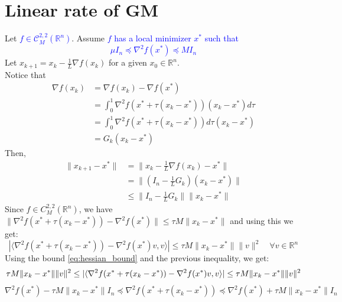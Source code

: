 \documentclass[12pt, openany]{report}
\newcommand{\R}{\mathbb{R}}
\newcommand{\C}{\mathcal{C}}
\theoremstyle{definition}
\begin{document}
\section{Linear rate of GM}
Let \textcolor{blue}{$f \in \C_M^{2,2}(\R^n)$}. Assume \textcolor{blue}{$f$ has a local minimizer $x^*$ such that 
\begin{equation}\label{eq:hessian_bound}
	\mu I_n \preceq \nabla^2 f(x^*) \preceq MI_n
\end{equation}}
Let $x_{k+1} = x_k - \frac{1}{L} \nabla f(x_k)$ for a given $x_0 \in \R^n$.\\
Notice that
\begin{equation}\label{eq:G_k}
	\begin{aligned}
		\nabla f(x_k) &= \nabla f(x_k) - \nabla f(x^*)\\
		&= \int_{0}^{1} \nabla^2 f(x^* + \tau(x_k-x^*)) (x_k-x^*) d\tau\\
		&= \int_{0}^{1} \nabla^2 f(x^* + \tau(x_k-x^*)) d\tau (x_k-x^*) \\
		&= G_k (x_k-x^*)
	\end{aligned}
\end{equation}
Then,
\begin{equation}
	\begin{aligned}
		\|x_{k+1} - x^*\| &= \|x_k - \frac{1}{L} \nabla f(x_k) - x^*\|\\
		&= \|(I_n-\frac{1}{L}G_k)(x_k-x^*)\|\\
		&\leq \|I_n - \frac{1}{L}G_k\| \|x_k-x^*\|
	\end{aligned}
\end{equation}
Since $f \in C_M^{2,2}(\R^n)$, we have $\|\nabla^2f(x^*+\tau(x_k-x^*))-\nabla^2f(x^*)\| \leq \tau M \|x_k -x^*\|$ and using this we get:
\begin{equation}
	|\langle \nabla^2f(x^*+\tau(x_k-x^*))-\nabla^2f(x^*) v, v\rangle| \leq \tau M \|x_k -x^*\| \|v\|^2 \quad \forall v \in \R^n
\end{equation}
Using the bound \eqref{eq:hessian_bound} and the previous inequality, we get:
\begin{equation*}
		\tau M \|x_k -x^*\| \|v\|^2 \leq |\langle \nabla^2f(x^*+\tau(x_k-x^*))-\nabla^2f(x^*) v, v\rangle| \leq \tau M \|x_k -x^*\| \|v\|^2\\
\end{equation*}
\begin{equation*}
	\nabla^2 f(x^*) - \tau M \|x_k -x^*\| I_n \preceq \nabla^2f(x^*+\tau(x_k-x^*)) \preceq \nabla^2 f(x^*) + \tau M \|x_k -x^*\|I_n 
\end{equation*}
\end{document}
